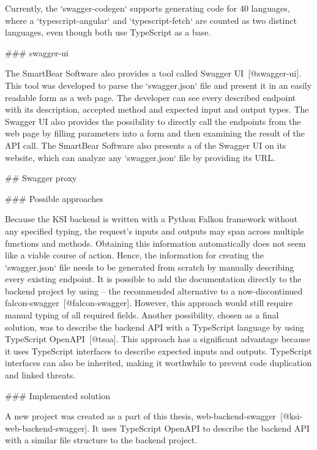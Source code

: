 \documentclass[
  digital, %
  oneside, %
  lof,     %
  nolot,     %
]{fithesis4}
\begin{document}
Currently, the `swagger-codegen` supports generating code for 40 languages, where a `typescript-angular` and `typescript-fetch` are counted as two distinct languages, even though both use TypeScript as a base.

### swagger-ui

The SmartBear Software also provides a tool called Swagger \acrshort{UI}~[@swagger-ui]. This tool was developed to parse the `swagger.json` file and present it in an easily readable form as a web page. The developer can see every described endpoint with its description, accepted method and expected input and output types. The Swagger \acrshort{UI} also provides the possibility to directly call the endpoints from the web page by filling parameters into a form and then examining the result of the \acrshort{API} call. The SmartBear Software also presents a  of the Swagger \acrshort{UI} on its website, which can analyze any `swagger.json` file by providing its URL.

## Swagger proxy

### Possible approaches

Because the \acrshort{KSI} backend is written with a Python Falkon framework without any specified typing, the request's inputs and outputs may span across multiple functions and methods. Obtaining this information automatically does not seem like a viable course of action. Hence, the information for creating the `swagger.json` file needs to be generated from scratch by manually describing every existing endpoint. It is possible to add the documentation directly to the backend project by using  -- the recommended alternative to a now-discontinued falcon-swagger~[@falcon-swagger]. However, this approach would still require manual typing of all required fields. Another possibility, chosen as a final solution, was to describe the backend \acrshort{API} with a TypeScript language by using TypeScript OpenAPI~[@tsoa]. This approach has a significant advantage because it uses TypeScript interfaces to describe expected inputs and outputs. TypeScript interfaces can also be inherited, making it worthwhile to prevent code duplication and linked threats.

### Implemented solution

A new project was created as a part of this thesis, web-backend-swagger~[@ksi-web-backend-swagger]. It uses TypeScript OpenAPI to describe the backend \acrshort{API} with a similar file structure to the backend project. 
\end{document}
